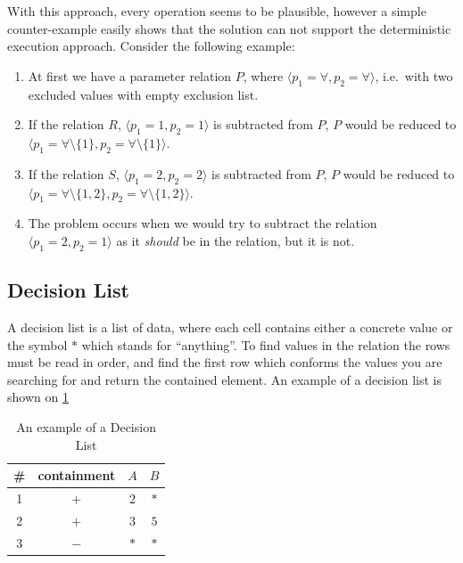 	With this approach, every operation seems to be plausible, however a simple counter-example easily shows that the solution can not support the deterministic execution approach.
	Consider the following example:
	\begin{enumerate}
		\item At first we have a parameter relation $P$, where $\langle p_1 = \forall, p_2 = \forall \rangle$, i.e.~with two excluded values with empty exclusion list.
		\item If the relation $R$, $\langle p_1 = 1, p_2 = 1 \rangle$ is subtracted from $P$, $P$ would be reduced to $\langle p_1 = \forall \setminus \{1\}, p_2 = \forall \setminus \{1\} \rangle$.
		\item If the relation $S$, $\langle p_1 = 2, p_2 = 2 \rangle$ is subtracted from $P$, $P$ would be reduced to $\langle p_1 = \forall \setminus \{1, 2\}, p_2 = \forall \setminus \{1, 2\} \rangle$.
		\item The problem occurs when we would try to subtract the relation $\langle p_1 = 2, p_2 = 1 \rangle$ as it \emph{should} be in the relation, but it is not. 
	\end{enumerate}

	\subsection{Decision List}
	
	A decision list is a list of data, where each cell contains either a concrete value or the symbol $\ast$ which stands
	for ``anything''. To find values in the relation the rows must be read in order, and find the first row which conforms the values you are searching for and return the contained element.
	An example of a decision list is shown on \cref{tab:cep:decision_list}
	
	\begin{table}
		\centering
		\caption{An example of a Decision List}		
		\label{tab:cep:decision_list}
		\begin{tabular}{cccc}
			\toprule
			\# & containment &  $A$   &  $B$   \\ \midrule
			1  &     $+$     &  $2$   & $\ast$ \\
			2  &     $+$     &  $3$   &  $5$   \\
			3  &     $-$     & $\ast$ & $\ast$ \\ \bottomrule
		\end{tabular}
	\end{table}

